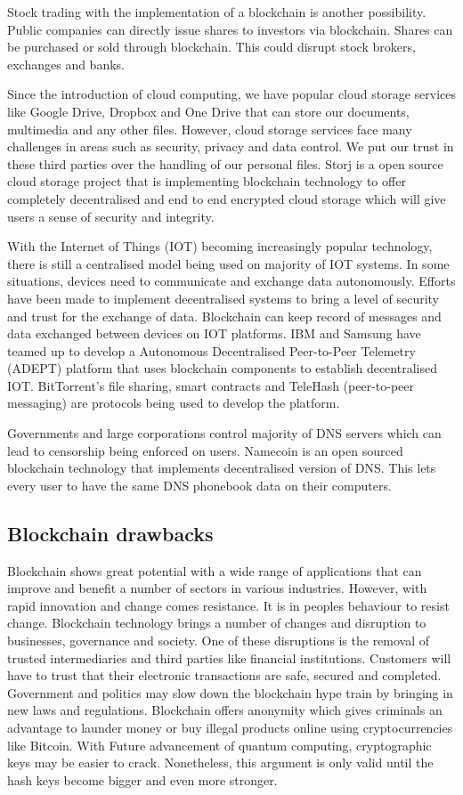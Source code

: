 \documentclass[report]{IEEEtran}
\begin{document}
Stock trading with the implementation of a blockchain is another possibility. Public companies can directly issue shares to investors via blockchain. Shares can be purchased or sold through blockchain. This could disrupt stock brokers, exchanges and banks. 

Since the introduction of cloud computing, we have popular cloud storage services like Google Drive, Dropbox and One Drive that can store our documents, multimedia and any other files. However, cloud storage services face many challenges in areas such as security, privacy and data control. We put our trust in these third parties over the handling of our personal files. Storj is a open source cloud storage project that is implementing blockchain technology to offer completely decentralised and end to end encrypted cloud storage which will give users a sense of security and integrity.

With the Internet of Things (IOT) becoming increasingly popular technology, there is still a centralised model being used on majority of IOT systems. In some situations, devices need to communicate and exchange data autonomously. Efforts have been made to implement decentralised systems to bring a level of security and trust for the exchange of data. Blockchain can keep record of messages and data exchanged between devices on IOT platforms. IBM and Samsung have teamed up to develop a Autonomous Decentralised Peer-to-Peer Telemetry (ADEPT) platform that uses blockchain components to establish decentralised IOT. BitTorrent's file sharing, smart contracts and TeleHash (peer-to-peer messaging) are protocols being used to develop the platform. 

Governments and large corporations control majority of DNS servers which can lead to censorship being enforced on users. Namecoin is an open sourced blockchain technology that implements decentralised version of DNS. This lets every user to have the same DNS phonebook data on their computers.

\subsection{Blockchain drawbacks}
Blockchain shows great potential with a wide range of applications that can improve and benefit a number of sectors in various industries. However, with rapid innovation and change comes resistance. It is in peoples behaviour to resist change. Blockchain technology brings a number of changes and disruption to businesses, governance and society. One of these disruptions is the removal of trusted intermediaries and third parties like financial institutions. Customers will have to trust that their electronic transactions are safe, secured and completed. Government and politics may slow down the blockchain hype train by bringing in new laws and regulations. Blockchain offers anonymity which gives criminals an advantage to launder money or buy illegal products online using cryptocurrencies like Bitcoin. With Future advancement of quantum computing, cryptographic keys may be easier to crack. Nonetheless, this argument is only valid until the hash keys become bigger and even more stronger. 
\end{document}
